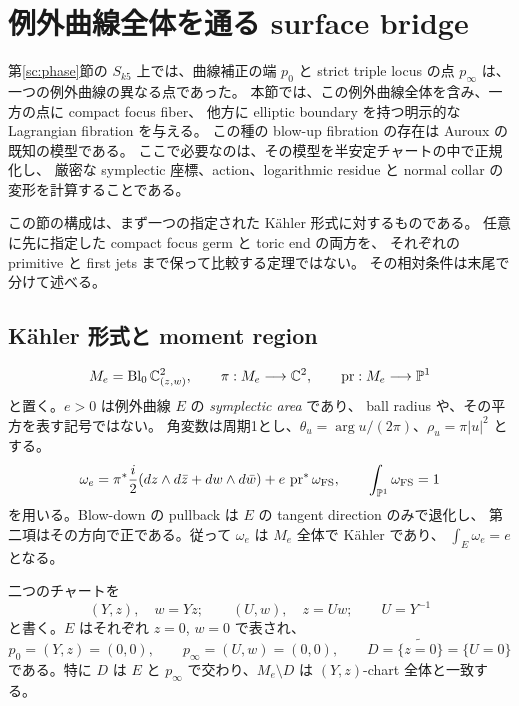 \section{例外曲線全体を通る surface bridge}
\label{exc:section}

第\ref{sc:phase}節の $S_{k5}$ 上では、曲線補正の端 $p_0$ と strict triple locus の点
$p_\infty$ は、一つの例外曲線の異なる点であった。
本節では、この例外曲線全体を含み、一方の点に compact focus fiber、
他方に elliptic boundary を持つ明示的な Lagrangian fibration を与える。
この種の blow-up fibration の存在は Auroux \cite[\S3.1.2]{auroux-blowup} の既知の模型である。
ここで必要なのは、その模型を半安定チャートの中で正規化し、
厳密な symplectic 座標、action、logarithmic residue と normal collar の変形を計算することである。

この節の構成は、まず一つの指定された K\"ahler 形式に対するものである。
任意に先に指定した compact focus germ と toric end の両方を、
それぞれの primitive と first jets まで保って比較する定理ではない。
その相対条件は末尾で分けて述べる。

\subsection{K\"ahler 形式と moment region}

\[
 M_e=\operatorname{Bl}_0\mathbb C^2_{(z,w)},\qquad
 \pi:M_e\longrightarrow\mathbb C^2,\qquad
 \operatorname{pr}:M_e\longrightarrow\mathbb P^1
\]
と置く。$e>0$ は例外曲線 $E$ の \emph{symplectic area} であり、
ball radius や、その平方を表す記号ではない。
角変数は周期1とし、$\theta_u=\arg u/(2\pi)$、$\rho_u=\pi|u|^2$ とする。
\begin{equation}\label{exc:kahler}
 \omega_e=\pi^*\frac{i}{2}
       (dz\wedge d\bar z+dw\wedge d\bar w)
       +e\,\operatorname{pr}^*\omega_{\rm FS},
 \qquad \int_{\mathbb P^1}\omega_{\rm FS}=1
\end{equation}
を用いる。Blow-down の pullback は $E$ の tangent direction のみで退化し、
第二項はその方向で正である。従って $\omega_e$ は $M_e$ 全体で K\"ahler であり、
$\int_E\omega_e=e$ となる。

二つのチャートを
\[
 (Y,z),\quad w=Yz;
 \qquad (U,w),\quad z=Uw;
 \qquad U=Y^{-1}
\]
と書く。$E$ はそれぞれ $z=0$, $w=0$ で表され、
\[
 p_0=(Y,z)=(0,0),\qquad
 p_\infty=(U,w)=(0,0),\qquad
 D=\widetilde{\{z=0\}}=\{U=0\}
\]
である。特に $D$ は $E$ と $p_\infty$ で交わり、$M_e\setminus D$ は
$(Y,z)$-chart 全体と一致する。

